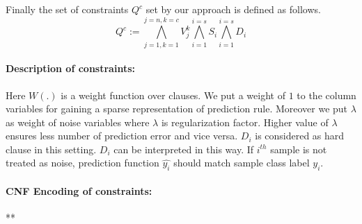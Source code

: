 	Finally the set of constraints $ Q^c $ set by our approach is defined as follows.
	\[
	Q^c:=\bigwedge_{j=1,k=1}^{j=n,k=c} V_j^k \bigwedge_{i=1}^{i=s} S_i \bigwedge_{i=1}^{i=s} D_i
	\]
	
	\paragraph{Description of constraints:} 
	Here $ W(.) $ is a weight function over clauses. We put a weight of $ 1 $ to the column variables for gaining a sparse representation of prediction rule. Moreover we put $ \lambda $ as weight of noise variables where $ \lambda $ is regularization factor. Higher value of $ \lambda $ ensures less number of prediction error and vice versa. $ D_i $ is considered as hard clause in this setting. $ D_i $ can be interpreted in this way. If  $ i^{th} $ sample is not treated as noise, 
	prediction function $ \hat{y_i} $ should match sample class label $ y_i $. 
	
	\paragraph{CNF Encoding of constraints:} **
	